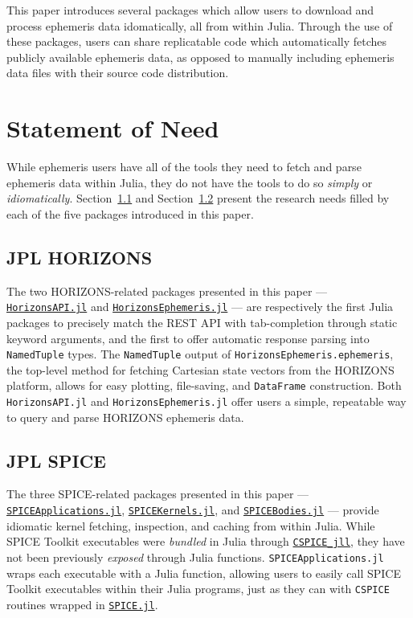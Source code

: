 \documentclass[
]{article}
\begin{document}
This paper introduces several packages which allow users to download and
process ephemeris data idomatically, all from within Julia. Through the
use of these packages, users can share replicatable code which
automatically fetches publicly available ephemeris data, as opposed to
manually including ephemeris data files with their source code
distribution.

\section{Statement of Need}\label{sec-need}

While ephemeris users have all of the tools they need to fetch and parse
ephemeris data within Julia, they do not have the tools to do so
\emph{simply} or \emph{idiomatically}. Section~\ref{sec-need-horizons}
and Section~\ref{sec-need-spice} present the research needs filled by
each of the five packages introduced in this paper.

\subsection{JPL HORIZONS}\label{sec-need-horizons}

The two HORIZONS-related packages presented in this paper ---
\href{https://github.com/cadojo/HorizonsAPI.jl}{\texttt{HorizonsAPI.jl}}
and
\href{https://github.com/cadojo/HorizonsEphemeris.jl}{\texttt{HorizonsEphemeris.jl}}
--- are respectively the first Julia packages to precisely match the
REST API with tab-completion through static keyword arguments, and the
first to offer automatic response parsing into \texttt{NamedTuple}
types. The \texttt{NamedTuple} output of
\texttt{HorizonsEphemeris.ephemeris}, the top-level method for fetching
Cartesian state vectors from the HORIZONS platform, allows for easy
plotting, file-saving, and \texttt{DataFrame} construction. Both
\texttt{HorizonsAPI.jl} and \texttt{HorizonsEphemeris.jl} offer users a
simple, repeatable way to query and parse HORIZONS ephemeris data.

\subsection{JPL SPICE}\label{sec-need-spice}

The three SPICE-related packages presented in this paper ---
\href{https://github.com/cadojo/SPICEApplications.jl}{\texttt{SPICEApplications.jl}},
\href{https://github.com/cadojo/SPICEKernels.jl}{\texttt{SPICEKernels.jl}},
and
\href{https://github.com/cadojo/SPICEBodies.jl}{\texttt{SPICEBodies.jl}}
--- provide idiomatic kernel fetching, inspection, and caching from
within Julia. While SPICE Toolkit executables were \emph{bundled} in
Julia through
\href{https://github.com/JuliaBinaryWrappers/CSPICE_jll.jl}{\texttt{CSPICE\_jll}},
they have not been previously \emph{exposed} through Julia functions.
\texttt{SPICEApplications.jl} wraps each executable with a Julia
function, allowing users to easily call SPICE Toolkit executables within
their Julia programs, just as they can with \texttt{CSPICE} routines
wrapped in
\href{https://github.com/JuliaAstro/SPICE.jl}{\texttt{SPICE.jl}}.
\end{document}
